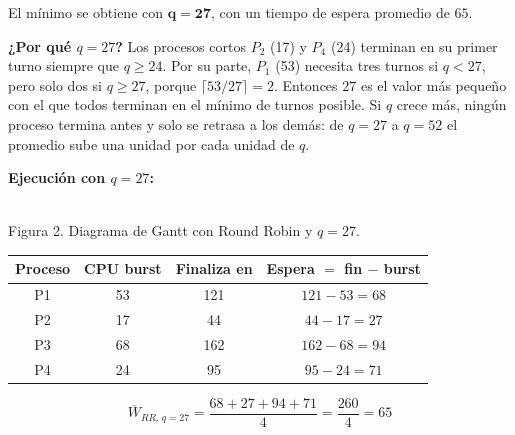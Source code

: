 \documentclass[a4paper, 11pt]{article}
\begin{document}
\begin{enumerate}
{        El mínimo se obtiene con $\boldsymbol{q = 27}$, con un tiempo de espera promedio de $65$.

        \textbf{¿Por qué $q=27$?} Los procesos cortos $P_2$ (17) y $P_4$ (24) terminan en su primer turno siempre que $q \ge 24$. Por su parte, $P_1$ (53) necesita tres turnos si $q<27$, pero solo dos si $q \ge 27$, porque $\lceil 53/27 \rceil = 2$. Entonces $27$ es el valor más pequeño con el que todos terminan en el mínimo de turnos posible. Si $q$ crece más, ningún proceso termina antes y solo se retrasa a los demás: de $q=27$ a $q=52$ el promedio sube una unidad por cada unidad de $q$.

        \textbf{Ejecución con $q=27$:}
\begin{center}
\\[2pt] {\footnotesize\color{black} Figura 2. Diagrama de Gantt con Round Robin y $q = 27$.}
\end{center}
        \begin{center}
        \begin{tabular}{|c|c|c|c|}
            \hline
            \textbf{Proceso} & \textbf{CPU burst} & \textbf{Finaliza en} & \textbf{Espera} $= $ fin $-$ burst \\
            \hline
            P1 & 53 & 121 & $121-53 = 68$ \\
            \hline
            P2 & 17 & 44 & $44-17 = 27$ \\
            \hline
            P3 & 68 & 162 & $162-68 = 94$ \\
            \hline
            P4 & 24 & 95 & $95-24 = 71$ \\
            \hline
        \end{tabular}
        \end{center}
        \[ \overline{W}_{RR,\,q=27} = \frac{68+27+94+71}{4} = \frac{260}{4} = 65 \]

}
\end{enumerate}
\end{document}
